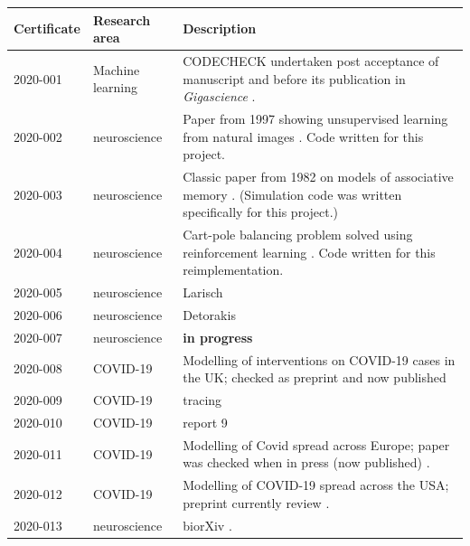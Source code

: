 \documentclass[12pt]{article}
\begin{document}
\begin{table}
  \centering

  \begin{tabular}{llp{11cm}}
    \toprule
    Certificate & Research area & Description \\ \midrule
    2020-001 \cite{cert-2020-001} &
    Machine learning & CODECHECK undertaken post acceptance of
    manuscript and before its publication in \textit{Gigascience}
    \cite{Piccolo2020-lo}. \\
    2020-002  \cite{cert-2020-002} & neuroscience & Paper from 1997
 showing unsupervised learning from natural images \cite{Hancock1992-mp}.
 Code written for this project. \\
    2020-003  \cite{cert-2020-003} & neuroscience &  Classic paper
                                                     from 1982 on
                                                     models of
                                                     associative
                                                     memory
                                                     \cite{Hopfield1982-mz}.
    (Simulation code was written specifically for this project.)\\
    2020-004  \cite{cert-2020-004} & neuroscience & Cart-pole balancing problem solved using reinforcement learning \cite{Barto1983-rg}.  Code written for this reimplementation.\\
    2020-005  \cite{cert-2020-005} & neuroscience & Larisch \\
    2020-006  \cite{cert-2020-006} & neuroscience & Detorakis \\
    2020-007  \cite{cert-2020-007} & neuroscience & \textbf{in progress} \\
    2020-008  \cite{cert-2020-008} & COVID-19 & Modelling of
    interventions on COVID-19 cases in the UK; checked as preprint
    and now published \cite{Davies2020-vj} \\
    2020-009  \cite{cert-2020-009} & COVID-19 & tracing \\
    2020-010  \cite{cert-2020-010} & COVID-19 & report 9 \\
    2020-011  \cite{cert-2020-011} & COVID-19 & Modelling of Covid
    spread across Europe;  paper was checked when in press (now  published) \cite{Flaxman2020-yb}. \\
    2020-012  \cite{cert-2020-012} & COVID-19 & Modelling of COVID-19 spread across the USA; preprint currently review \cite{Unwin2020}. \\
    2020-013  \cite{cert-2020-013} & neuroscience & biorXiv \cite{Spitschan2020.06.02.129502}. \\

\end{tabular}
\end{table}
\end{document}
